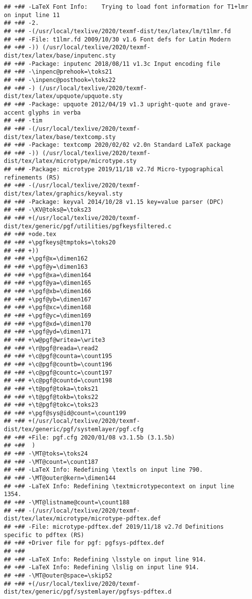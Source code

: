 \documentclass[ignorenonframetext,]{beamer}
\begin{document}
\begin{verbatim}
## +## -LaTeX Font Info:    Trying to load font information for T1+lmr on input line 11
## +## -2.
## +## -(/usr/local/texlive/2020/texmf-dist/tex/latex/lm/t1lmr.fd
## +## -File: t1lmr.fd 2009/10/30 v1.6 Font defs for Latin Modern
## +## -)) (/usr/local/texlive/2020/texmf-dist/tex/latex/base/inputenc.sty
## +## -Package: inputenc 2018/08/11 v1.3c Input encoding file
## +## -\inpenc@prehook=\toks21
## +## -\inpenc@posthook=\toks22
## +## -) (/usr/local/texlive/2020/texmf-dist/tex/latex/upquote/upquote.sty
## +## -Package: upquote 2012/04/19 v1.3 upright-quote and grave-accent glyphs in verba
## +## -tim
## +## -(/usr/local/texlive/2020/texmf-dist/tex/latex/base/textcomp.sty
## +## -Package: textcomp 2020/02/02 v2.0n Standard LaTeX package
## +## -)) (/usr/local/texlive/2020/texmf-dist/tex/latex/microtype/microtype.sty
## +## -Package: microtype 2019/11/18 v2.7d Micro-typographical refinements (RS)
## +## -(/usr/local/texlive/2020/texmf-dist/tex/latex/graphics/keyval.sty
## +## -Package: keyval 2014/10/28 v1.15 key=value parser (DPC)
## +## -\KV@toks@=\toks23
## +## +(/usr/local/texlive/2020/texmf-dist/tex/generic/pgf/utilities/pgfkeysfiltered.c
## +## +ode.tex
## +## +\pgfkeys@tmptoks=\toks20
## +## +))
## +## +\pgf@x=\dimen162
## +## +\pgf@y=\dimen163
## +## +\pgf@xa=\dimen164
## +## +\pgf@ya=\dimen165
## +## +\pgf@xb=\dimen166
## +## +\pgf@yb=\dimen167
## +## +\pgf@xc=\dimen168
## +## +\pgf@yc=\dimen169
## +## +\pgf@xd=\dimen170
## +## +\pgf@yd=\dimen171
## +## +\w@pgf@writea=\write3
## +## +\r@pgf@reada=\read2
## +## +\c@pgf@counta=\count195
## +## +\c@pgf@countb=\count196
## +## +\c@pgf@countc=\count197
## +## +\c@pgf@countd=\count198
## +## +\t@pgf@toka=\toks21
## +## +\t@pgf@tokb=\toks22
## +## +\t@pgf@tokc=\toks23
## +## +\pgf@sys@id@count=\count199
## +## +(/usr/local/texlive/2020/texmf-dist/tex/generic/pgf/systemlayer/pgf.cfg
## +## +File: pgf.cfg 2020/01/08 v3.1.5b (3.1.5b)
## +##  )
## +## -\MT@toks=\toks24
## +## -\MT@count=\count187
## +## -LaTeX Info: Redefining \textls on input line 790.
## +## -\MT@outer@kern=\dimen144
## +## -LaTeX Info: Redefining \textmicrotypecontext on input line 1354.
## +## -\MT@listname@count=\count188
## +## -(/usr/local/texlive/2020/texmf-dist/tex/latex/microtype/microtype-pdftex.def
## +## -File: microtype-pdftex.def 2019/11/18 v2.7d Definitions specific to pdftex (RS)
## +## +Driver file for pgf: pgfsys-pdftex.def
## +##  
## +## -LaTeX Info: Redefining \lsstyle on input line 914.
## +## -LaTeX Info: Redefining \lslig on input line 914.
## +## -\MT@outer@space=\skip52
## +## +(/usr/local/texlive/2020/texmf-dist/tex/generic/pgf/systemlayer/pgfsys-pdftex.d

\end{verbatim}
\end{document}
